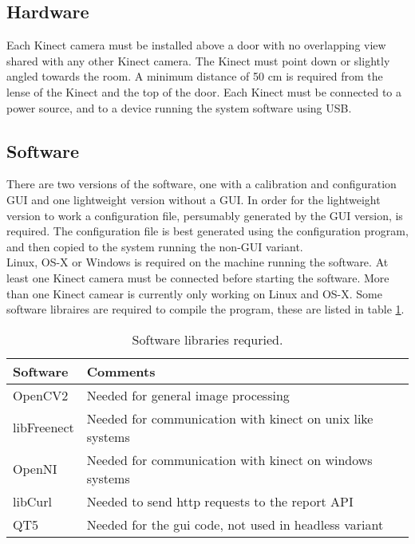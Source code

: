\subsection{Hardware}
Each Kinect camera must be installed above a door with no overlapping view shared with any other Kinect camera. The Kinect must point down or slightly angled towards the room. A minimum distance of 50 cm is required from the lense of the Kinect and the top of the door. Each Kinect must be connected to a power source, and to a device running the system software using USB.

\subsection{Software}
There are two versions of the software, one with a calibration and configuration GUI and one lightweight version without a GUI. In order for the lightweight version to work a configuration file, persumably generated by the GUI version, is required. The configuration file is best generated using the configuration program, and then copied to the system running the non-GUI variant. \\

Linux, OS-X or Windows is required on the machine running the software. At least one Kinect camera must be connected before starting the software. More than one Kinect camear is currently only working on Linux and OS-X. Some software libraires are required to compile the program, these are listed in table \ref{reqSoftware}. \\

\begin{table} [hbt]
\begin{center}
  \begin{tabular}{ | l | l | }
    \hline
    \textbf{Software} & \textbf{Comments} \\ \hline
    OpenCV2 & Needed for general image processing  \\ \hline
    libFreenect & Needed for communication with kinect on unix like systems  \\ \hline
    OpenNI & Needed for communication with kinect on windows systems  \\ \hline
    libCurl & Needed to send http requests to the report API \\ \hline
    QT5 & Needed for the gui code, not used in headless variant \\ \hline
  \end{tabular}
  \label{reqSoftware}
  \caption{Software libraries requried.}
\end{center}
\end{table}